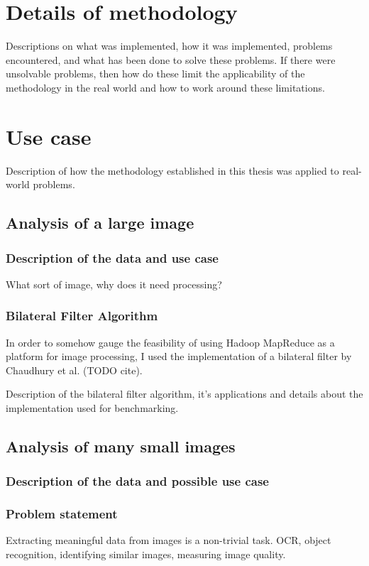\documentclass [12pt,a4paper]{report}
\begin{document}
\chapter{Details of methodology}
Descriptions on what was implemented, how it was implemented, problems encountered, and what has been done to solve these problems. If there were unsolvable problems, then how do these limit the applicability of the methodology in the real world and how to work around these limitations.

\chapter{Use case}
Description of how the methodology established in this thesis was applied to real-world problems.

\section{Analysis of a large image}

\subsection{Description of the data and use case}
What sort of image, why does it need processing?

\subsection{Bilateral Filter Algorithm}

In order to somehow gauge the feasibility of using Hadoop MapReduce as a platform for image processing, I used the implementation of a bilateral filter by Chaudhury et al. (TODO cite).

Description of the bilateral filter algorithm, it's applications and details about the implementation used for benchmarking.

\section{Analysis of many small images}

\subsection{Description of the data and possible use case}

\subsection{Problem statement}

Extracting meaningful data from images is a non-trivial task. OCR, object recognition, identifying similar images, measuring image quality.


\clearpage
{}


\end{document}
